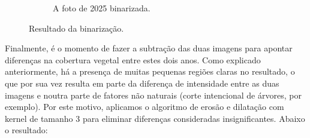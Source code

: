 \documentclass{article}
\begin{document}
\begin{figure}[H]
\begin{subfigure}[b]{0.48\textwidth}
        \caption{A foto de 2025 binarizada.}
        \label{2025}
    \end{subfigure}
    \caption{Resultado da binarização.}
    \label{binarizada}
\end{figure}

Finalmente, é o momento de fazer a subtração das duas imagens para apontar diferenças na cobertura vegetal entre estes dois anos. Como explicado anteriormente, há a presença de muitas pequenas regiões claras no resultado, o que por sua vez resulta em parte da diferença de intensidade entre as duas imagens e noutra parte de fatores não naturais (corte intencional de árvores, por exemplo). Por este motivo, aplicamos o algoritmo de erosão e dilatação com kernel de tamanho 3 para eliminar diferenças consideradas insignificantes. Abaixo o resultado:
\end{document}
